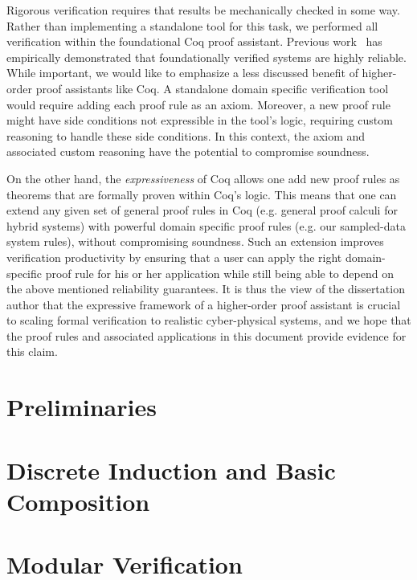 \documentclass[12pt]{ucsddissertation}
\begin{document}
\begin{dissertationintroduction}
Rigorous verification requires that results be mechanically checked in some
way. Rather than implementing a standalone tool for this task, we performed
all verification within the foundational Coq proof assistant. Previous
work~\cite{yang2011understanding-compiler-bugs} has empirically
demonstrated that foundationally verified systems are highly
reliable. While important, we would like to emphasize a less discussed
benefit of higher-order proof assistants like Coq. A standalone domain
specific verification tool would require adding each proof rule as an
axiom. Moreover, a new proof rule might have side conditions not
expressible in the tool's logic, requiring custom reasoning to handle these
side conditions. In this context, the axiom and associated custom reasoning
have the potential to compromise soundness.

On the other hand, the \emph{expressiveness} of Coq allows one add new
proof rules as theorems that are formally proven within Coq's logic. This
means that one can extend any given set of general proof rules in Coq
(e.g. general proof calculi for hybrid systems) with powerful domain
specific proof rules (e.g. our sampled-data system rules), without
compromising soundness. Such an extension improves verification
productivity by ensuring that a user can apply the right domain-specific
proof rule for his or her application while still being able to depend on
the above mentioned reliability guarantees.
\thesis
It is thus the view of the dissertation author that the expressive
framework of a higher-order proof assistant is crucial to scaling formal
verification to realistic cyber-physical systems, and we hope that the
proof rules and associated applications in this document provide evidence
for this claim.

\end{dissertationintroduction}

\chapter{Preliminaries}
\label{chap:prelim}


\chapter{Discrete Induction and Basic Composition}
\label{chap:memo15}


\chapter{Modular Verification}
\label{chap:emsoft16}

\end{document}
